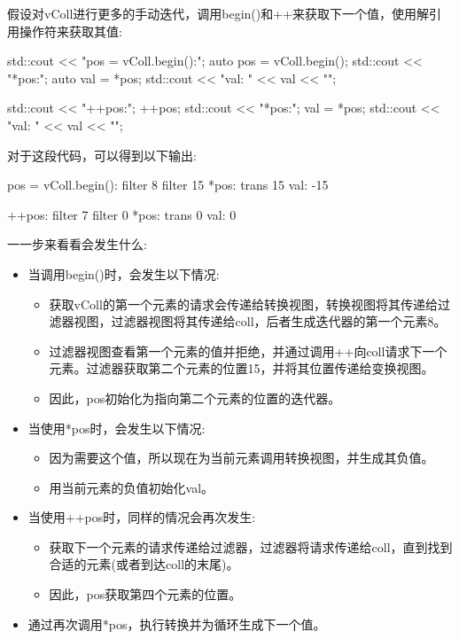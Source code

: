 假设对vColl进行更多的手动迭代，调用begin()和++来获取下一个值，使用解引用操作符来获取其值:

\begin{cpp}
std::cout << "pos = vColl.begin():\n";
auto pos = vColl.begin();
std::cout << "*pos:\n";
auto val = *pos;
std::cout << "val: " << val << "\n\n";

std::cout << "++pos:\n";
++pos;
std::cout << "*pos:\n";
val = *pos;
std::cout << "val: " << val << "\n\n";
\end{cpp}

对于这段代码，可以得到以下输出:

\begin{shell}
pos = vColl.begin():
filter 8
filter 15
*pos:
trans 15
val: -15

++pos:
filter 7
filter 0
*pos:
trans 0
val: 0
\end{shell}

一一步来看看会发生什么:

\begin{itemize}
\item
当调用begin()时，会发生以下情况:

\begin{itemize}
\item
获取vColl的第一个元素的请求会传递给转换视图，转换视图将其传递给过滤器视图，过滤器视图将其传递给coll，后者生成迭代器的第一个元素8。

\item
过滤器视图查看第一个元素的值并拒绝，并通过调用++向coll请求下一个元素。过滤器获取第二个元素的位置15，并将其位置传递给变换视图。

\item
因此，pos初始化为指向第二个元素的位置的迭代器。
\end{itemize}

\item
当使用*pos时，会发生以下情况:

\begin{itemize}
\item
因为需要这个值，所以现在为当前元素调用转换视图，并生成其负值。

\item
用当前元素的负值初始化val。
\end{itemize}

\item
当使用++pos时，同样的情况会再次发生:

\begin{itemize}
\item
获取下一个元素的请求传递给过滤器，过滤器将请求传递给coll，直到找到合适的元素(或者到达coll的末尾)。

\item
因此，pos获取第四个元素的位置。
\end{itemize}

\item
通过再次调用*pos，执行转换并为循环生成下一个值。
\end{itemize}

